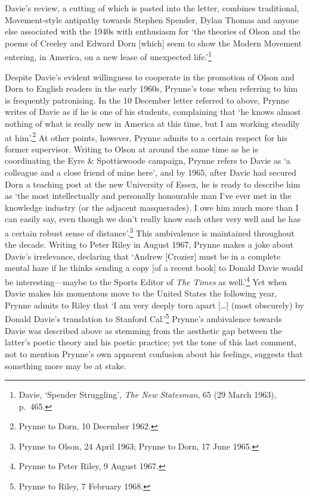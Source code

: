 \documentclass[]{article}
\begin{document}
\noindent Davie's review, a cutting of which is pasted into the letter,
combines traditional, Movement-style antipathy towards Stephen Spender,
Dylan Thomas and anyone else associated with the 1940s with enthusiasm
for `the theories of Olson and the poems of Creeley and Edward Dorn
{[}which{]} seem to show the Modern Movement entering, in America, on a
new lease of unexpected life.'\footnote{Davie, `Spender Struggling',
  \emph{The New Statesman}, 65 (29 March 1963), p.~465.}

Despite Davie's evident willingness to cooperate in the promotion of
Olson and Dorn to English readers in the early 1960s, Prynne's tone when
referring to him is frequently patronising. In the 10 December letter
referred to above, Prynne writes of Davie as if he is one of his
students, complaining that `he knows almost nothing of what is really
new in America at this time, but I am working steadily at
him'.\footnote{Prynne to Dorn, 10 December 1962.} At other points,
however, Prynne admits to a certain respect for his former supervisor.
Writing to Olson at around the same time as he is coordinating the Eyre
\& Spottiswoode campaign, Prynne refers to Davie as `a colleague and a
close friend of mine here', and by 1965, after Davie had secured Dorn a
teaching post at the new University of Essex, he is ready to describe
him as `the most intellectually and personally honourable man I've ever
met in the knowledge industry (or the adjacent masquerades). I owe him
much more than I can easily say, even though we don't really know each
other very well and he has a certain robust sense of
distance'.\footnote{Prynne to Olson, 24 April 1963; Prynne to Dorn, 17
  June 1965.} This ambivalence is maintained throughout the decade.
Writing to Peter Riley in August 1967, Prynne makes a joke about Davie's
irrelevance, declaring that `Andrew {[}Crozier{]} must be in a complete
mental haze if he thinks sending a copy {[}of a recent book{]} to Donald
Davie would be interesting---maybe to the Sports Editor of \emph{The
Times} as well.'\footnote{Prynne to Peter Riley, 9 August 1967.} Yet
when Davie makes his momentous move to the United States the following
year, Prynne admits to Riley that `I am very deeply torn apart
{[}\ldots{}{]} (most obscurely) by Donald Davie's translation to
Stanford Cal.'\footnote{Prynne to Riley, 7 February 1968.} Prynne's
ambivalence towards Davie was described above as stemming from the
aesthetic gap between the latter's poetic theory and his poetic
practice; yet the tone of this last comment, not to mention Prynne's own
apparent confusion about his feelings, suggests that something more may
be at stake.
\end{document}
